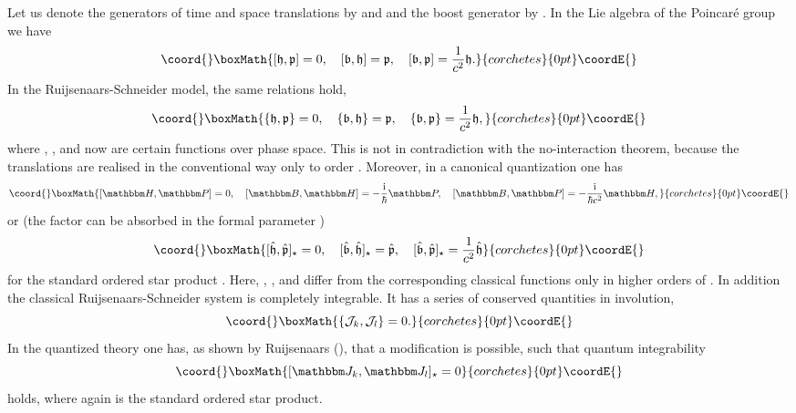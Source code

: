\documentclass[a4paper,12pt]{article}
\begin{document}
Let us denote the generators of time and space translations by \coordHE{} and 
\coordHE{} and the boost generator by \coordHE{}. In the Lie algebra of
the Poincar\'e group we have 
\[\coord{}\boxMath{
[\mathfrak h,\mathfrak p]=0,\quad [\mathfrak b,\mathfrak h]=\mathfrak p,\quad
[\mathfrak b,\mathfrak p]=\frac{1}{c^2}\mathfrak h.
}{corchetes}{0pt}\coordE{}\]
In the Ruijsenaars-Schneider model, 
the same relations hold,
\[\coord{}\boxMath{
\{\mathfrak h,\mathfrak p\}=0,\quad \{\mathfrak b,\mathfrak h\}=\mathfrak p,\quad
\{\mathfrak b,\mathfrak p\}=\frac{1}{c^2}\mathfrak h,
}{corchetes}{0pt}\coordE{}\]
where \coordHE{}, \coordHE{}, and \coordHE{} now are certain
functions over phase space. 
This is not in contradiction with the no-interaction theorem, because the
translations are realised in the conventional way only to order \coordHE{}.
Moreover, in a canonical quantization one has
\[\coord{}\boxMath{
[\mathbbm H,\mathbbm P]=0,\quad 
[\mathbbm B,\mathbbm H]=-\frac{\textrm{i}}\hbar\mathbbm P, \quad
[\mathbbm B,\mathbbm P]=-\frac{\textrm{i}}{\hbar c^2}\mathbbm H,
}{corchetes}{0pt}\coordE{}\]
or 
(the factor \coordHE{} can be absorbed in the formal parameter \myHighlight{$\lambda$}\coordHE{})
\[\coord{}\boxMath{
[\hat{\mathfrak h},\hat{\mathfrak p}]_\star=0,
\quad [\hat{\mathfrak b},\hat{\mathfrak h}]_\star=\hat{\mathfrak p},
\quad
[\hat{\mathfrak b},\hat{\mathfrak p}]_\star=\frac{1}{c^2}\hat{\mathfrak h}
}{corchetes}{0pt}\coordE{}\]
for the standard ordered star product \myHighlight{$\star$}\coordHE{}.
Here, \coordHE{}, \coordHE{}, and \coordHE{} 
differ from the corresponding classical
functions only in higher orders of \myHighlight{$\lambda$}\coordHE{}.
In addition the classical Ruijsenaars-Schneider system is completely
integrable. It has a series of conserved quantities \coordHE{} in
involution,
\[\coord{}\boxMath{
\{\mathcal J_k,\mathcal J_l\}=0.
}{corchetes}{0pt}\coordE{}\]
In the quantized theory one has, as shown by Ruijsenaars (\cite{Ruij87}), 
that a modification
\coordHE{} is possible, such that quantum integrability 
\[\coord{}\boxMath{
[\mathbbm J_k,\mathbbm J_l]_\star=0
}{corchetes}{0pt}\coordE{}\]
holds, where \myHighlight{$\star$}\coordHE{} again is the standard ordered star product. 
\end{document}
